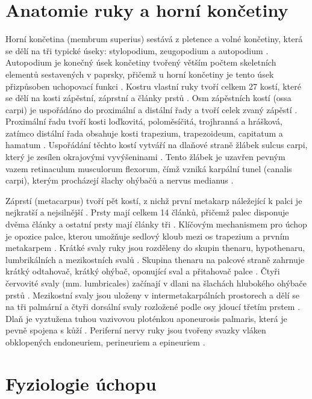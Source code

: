 \documentclass[FZS,DP]{tulthesis}
\begin{document}
\section{Anatomie ruky a horní končetiny}

Horní končetina (membrum superius) sestává z pletence a volné končetiny, která se dělí na tři typické úseky: stylopodium, zeugopodium a autopodium \cite{Cihak2011}. Autopodium je konečný úsek končetiny tvořený větším počtem skeletních elementů sestavených v paprsky, přičemž u horní končetiny je tento úsek přizpůsoben uchopovací funkci \cite{Cihak2011}. Kostru vlastní ruky tvoří celkem 27 kostí, které se dělí na kosti zápěstní, záprstní a články prstů \cite{Stuchla2024}. Osm zápěstních kostí (ossa carpi) je uspořádáno do proximální a distální řady a tvoří celek zvaný zápěstí \cite{Cihak2011}. Proximální řadu tvoří kosti loďkovitá, poloměsíčitá, trojhranná a hrášková, zatímco distální řada obsahuje kosti trapezium, trapezoideum, capitatum a hamatum \cite{Stuchla2024}. Uspořádání těchto kostí vytváří na dlaňové straně žlábek sulcus carpi, který je zesílen okrajovými vyvýšeninami \cite{Cihak2011}. Tento žlábek je uzavřen pevným vazem retinaculum musculorum flexorum, čímž vzniká karpální tunel (canalis carpi), kterým procházejí šlachy ohýbačů a nervus medianus \cite{Cihak2011}.

Záprstí (metacarpus) tvoří pět kostí, z nichž první metakarp náležející k palci je nejkratší a nejsilnější \cite{Cihak2011}. Prsty mají celkem 14 článků, přičemž palec disponuje dvěma články a ostatní prsty mají články tři \cite{Stuchla2024}. Klíčovým mechanismem pro úchop je opozice palce, kterou umožňuje sedlový kloub mezi os trapezium a prvním metakarpem \cite{Cihak2011}. Krátké svaly ruky jsou rozděleny do skupin thenaru, hypothenaru, lumbrikálních a mezikostních svalů \cite{Stuchla2024}. Skupina thenaru na palcové straně zahrnuje krátký odtahovač, krátký ohýbač, oponující sval a přitahovač palce \cite{Cihak2011}. Čtyři červovité svaly (mm. lumbricales) začínají v dlani na šlachách hlubokého ohýbače prstů \cite{Cihak2011}. Mezikostní svaly jsou uloženy v intermetakarpálních prostorech a dělí se na tři palmární a čtyři dorsální svaly rozložené podle osy jdoucí třetím prstem \cite{Cihak2011}. Dlaň je vyztužena tuhou vazivovou ploténkou aponeurosis palmaris, která je pevně spojena s kůží \cite{Cihak2011}. Periferní nervy ruky jsou tvořeny svazky vláken obklopených endoneuriem, perineuriem a epineuriem \cite{Cihak2016}.

\section{Fyziologie úchopu}
\end{document}
